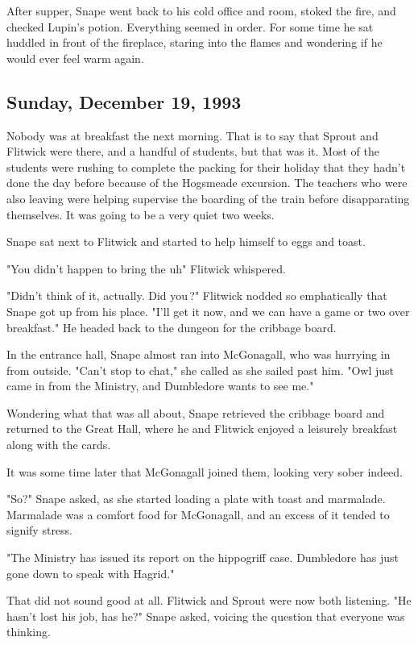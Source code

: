 After supper, Snape went back to his cold office and room, stoked the fire, and checked Lupin's potion. Everything seemed in order. For some time he sat huddled in front of the fireplace, staring into the flames and wondering if he would ever feel warm again.

\subsection{Sunday, December 19, 1993}

Nobody was at breakfast the next morning. That is to say that Sprout and Flitwick were there, and a handful of students, but that was it. Most of the students were rushing to complete the packing for their holiday that they hadn't done the day before because of the Hogsmeade excursion. The teachers who were also leaving were helping supervise the boarding of the train before disapparating themselves. It was going to be a very quiet two weeks.

Snape sat next to Flitwick and started to help himself to eggs and toast.

"You didn't happen to bring the{\el} uh{\el}" Flitwick whispered.

"Didn't think of it, actually. Did you{\el}\,?" Flitwick nodded so emphatically that Snape got up from his place. "I'll get it now, and we can have a game or two over breakfast." He headed back to the dungeon for the cribbage board.

In the entrance hall, Snape almost ran into McGonagall, who was hurrying in from outside. "Can't stop to chat," she called as she sailed past him. "Owl just came in from the Ministry, and Dumbledore wants to see me."

Wondering what that was all about, Snape retrieved the cribbage board and returned to the Great Hall, where he and Flitwick enjoyed a leisurely breakfast along with the cards.

It was some time later that McGonagall joined them, looking very sober indeed.

"So?" Snape asked, as she started loading a plate with toast and marmalade. Marmalade was a comfort food for McGonagall, and an excess of it tended to signify stress.

"The Ministry has issued its report on the hippogriff case. Dumbledore has just gone down to speak with Hagrid."

That did not sound good at all. Flitwick and Sprout were now both listening. "He hasn't lost his job, has he?" Snape asked, voicing the question that everyone was thinking.

